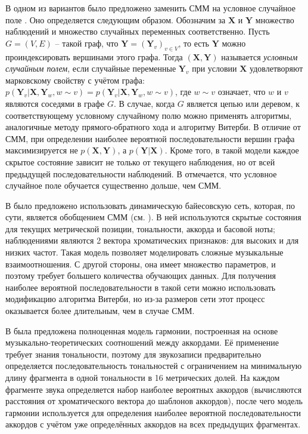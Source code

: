 В одном из вариантов \cite{Burgoyne2007} было предложено заменить СММ на
условное случайное поле \cite{Lafferty2001}. Оно определяется следующим образом.
Обозначим за $\boldsymbol{X}$ и $\boldsymbol{Y}$ множество наблюдений и
множество случайных переменных соответственно. Пусть $G = (V, E)$ -- такой граф,
что $\boldsymbol{Y} = (\boldsymbol{Y}_v)_{v \in V}$, то есть $\boldsymbol{Y}$
можно проиндексировать вершинами этого графа. Тогда $(\boldsymbol{X},
\boldsymbol{Y})$ называется \emph{условным случайным полем}, если случайные
переменные $\boldsymbol{Y}_v$ при условии $\boldsymbol{X}$ удовлетворяют
марковскому свойству с учётом графа: $p(\boldsymbol{Y}_v | \boldsymbol{X},
\boldsymbol{Y}_w, w \sim v) = p(\boldsymbol{Y}_v | \boldsymbol{X},
\boldsymbol{Y}_w, w \sim v)$, где $w \sim v$ означает, что $w$ и $v$ являются
соседями в графе $G$. В случае, когда $G$ является цепью или деревом, к
соответствующему условному случайному полю можно применять алгоритмы,
аналогичные методу прямого-обратного хода и алгоритму Витерби. В отличие от СММ,
при определении наиболее вероятной последовательности вершин графа
максимизируется не $p(\boldsymbol{X}, \boldsymbol{Y})$, а $p(\boldsymbol{Y} |
\boldsymbol{X})$. Кроме того, в такой модели каждое скрытое состояние зависит не
только от текущего наблюдения, но от всей предыдущей последовательности
наблюдений. В \cite{Burgoyne2007} отмечается, что условное случайное поле
обучается существенно дольше, чем СММ.

В \cite{Mauch2010} было предложено использовать динамическую байесовскую сеть,
которая, по сути, является обобщением СММ (см. \cite{Ghahramani2001}). В ней
используются скрытые состояния для текущих метрической позиции, тональности,
аккорда и басовой ноты; наблюдениями являются 2 вектора хроматических признаков:
для высоких и для низких частот. Такая модель позволяет моделировать сложные
музыкальные взаимоотношения. С другой стороны, она имеет множество параметров, и
поэтому требует большего количества обучающих данных. Для получения наиболее
вероятной последовательности в такой сети можно использовать модификацию
алгоритма Витерби, но из-за размеров сети этот процесс оказывается более
длительным, чем в случае СММ.

В \cite{DeHaas2012} была предложена полноценная модель гармонии, построенная на
основе музыкально-теоретических соотношений между аккордами. Её применение
требует знания тональности, поэтому для звукозаписи предварительно определяется
последовательность тональностей с ограничением на минимальную длину фрагмента в
одной тональности в 16 метрических долей. На каждом фрагменте звука определяется
набор наиболее вероятных аккордов (вычисляются расстояния от хроматического
вектора до шаблонов аккордов), после чего модель гармонии используется для
определения наиболее вероятной последовательности аккордов с учётом уже
определённых аккордов на всех предыдущих фрагментах.

